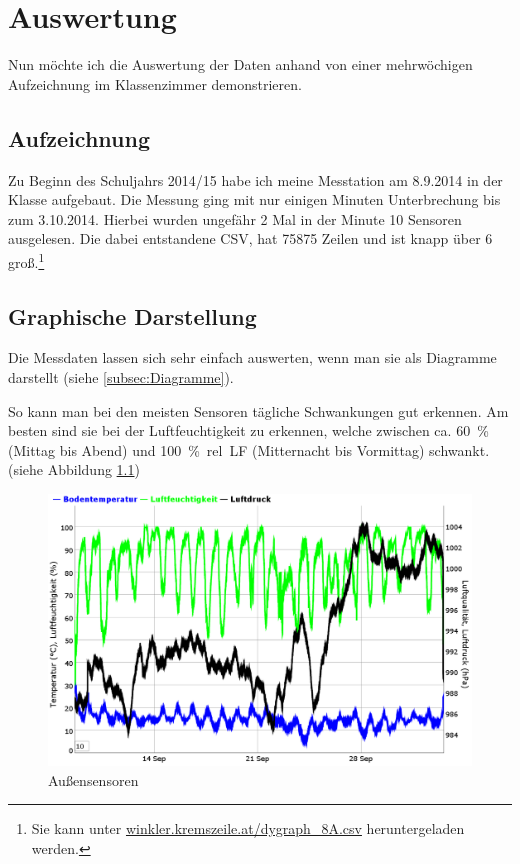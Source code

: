 \chapter{Auswertung}
\label{cha:Auswertung}

Nun möchte ich die Auswertung der Daten anhand von einer mehrwöchigen Aufzeichnung im Klassenzimmer demonstrieren.

\section{Aufzeichnung}
\label{auswertung_aufzeichnung}

Zu Beginn des Schuljahrs 2014/15 habe ich meine Messtation am 8.9.2014 in der Klasse aufgebaut. Die Messung ging mit nur einigen Minuten Unterbrechung bis zum 3.10.2014. Hierbei wurden ungefähr 2 Mal in der Minute 10 Sensoren ausgelesen. Die dabei entstandene \gls{CSV}, hat 75875 Zeilen und ist knapp über \SI{6}{\mega\byte} groß.\footnote{Sie kann unter \href{http://winkler.kremszeile.at/dygraph_8A.csv}{winkler.kremszeile.at/dygraph\_8A.csv} heruntergeladen werden.}

\section{Graphische Darstellung}

Die Messdaten lassen sich sehr einfach auswerten, wenn man sie als Diagramme darstellt (siehe \ref{subsec:Diagramme}). 

So kann man bei den meisten Sensoren tägliche Schwankungen gut erkennen. Am besten sind sie bei der Luftfeuchtigkeit zu erkennen, welche zwischen ca. \SI{60}{\%} (Mittag bis Abend) und \SI{100}{\%.rel.LF} (Mitternacht bis Vormittag) schwankt. (siehe Abbildung \ref{fig:auswertung-aussen}) 

\begin{figure}[p]
  \centering
     \includegraphics[width=0.95\textheight, angle=90]{figures/auswertung-aussen.png}
  \caption{Außensensoren}
  \label{fig:auswertung-aussen}
\end{figure}


